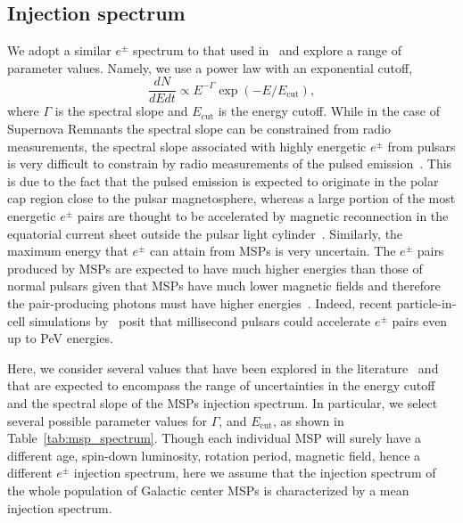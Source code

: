 \documentclass[doublespace,nopageskip]{VTthesis}
\begin{document}
\subsection{Injection spectrum}\label{sec:spectrum}

We adopt a similar $e^\pm$ spectrum to that used in~\citet{2015ApJ...802..124Y} and explore a range of parameter values. Namely, we use a power law with an exponential cutoff,
\begin{equation}
  \label{eq:msp_spectrum}
  \dfrac{dN}{dEdt} \propto E^{-\Gamma}\exp(-E/E_{\text{cut}}),
\end{equation}
where $\Gamma$ is the spectral slope and $E_{\text{cut}}$ is the energy cutoff. While in the case of Supernova Remnants the spectral slope can be constrained from radio measurements, the spectral slope associated with highly energetic $e^\pm$ from pulsars is very difficult to constrain by radio measurements of the pulsed emission~\citep{2010A&A...524A..51D}. This is due to the fact that the pulsed emission is expected to originate in the polar cap region close to the pulsar magnetosphere, whereas a large portion of the most energetic $e^\pm$ pairs are thought to be accelerated by magnetic reconnection in the equatorial current sheet outside the pulsar light cylinder~\citep{2016MNRAS.457.2401C}. Similarly, the maximum energy that $e^{\pm}$ can attain from MSPs is very uncertain. The $e^\pm$ pairs produced by MSPs are expected to have much higher energies than those of normal pulsars given that MSPs have much lower magnetic fields and therefore the pair-producing photons must have higher energies~\citep{2021arXiv210105751H}. Indeed, recent particle-in-cell simulations by~\citep{2020A&A...635A.138G} posit that millisecond pulsars could accelerate $e^\pm$ pairs even up to PeV energies.

Here, we consider several values that have been explored in the literature~\citep[e.g.,][]{2015ApJ...802..124Y,2020A&A...635A.138G} and that are expected to encompass the range of uncertainties in the energy cutoff and the spectral slope of the MSPs injection spectrum. In particular, we select several possible parameter values for $\Gamma$, and $E_{\text{cut}}$, as shown in Table~\ref{tab:msp_spectrum}. Though each individual MSP will surely have a different age, spin-down luminosity, rotation period, magnetic field, hence a different $e^\pm$ injection spectrum, here we assume that the injection spectrum of the whole population of Galactic center MSPs is characterized by a mean injection spectrum.
\end{document}
